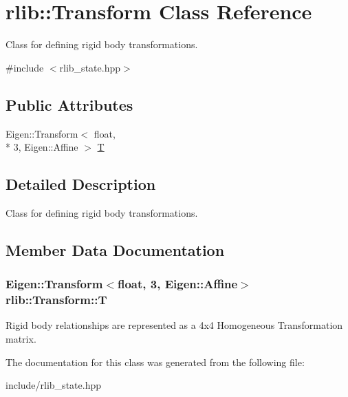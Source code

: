 \hypertarget{classrlib_1_1Transform}{\section{rlib\-:\-:Transform Class Reference}
\label{classrlib_1_1Transform}
}


Class for defining rigid body transformations.  




{\ttfamily \#include $<$rlib\-\_\-state.\-hpp$>$}

\subsection*{Public Attributes}
\begin{DoxyCompactItemize}
\item 
Eigen\-::\-Transform$<$ float, \\*
3, Eigen\-::\-Affine $>$ \hyperlink{classrlib_1_1Transform_a38135d56804225fa5e1bac5a5c6b3d9d}{T}
\end{DoxyCompactItemize}


\subsection{Detailed Description}
Class for defining rigid body transformations. 

\subsection{Member Data Documentation}
\hypertarget{classrlib_1_1Transform_a38135d56804225fa5e1bac5a5c6b3d9d}{
\subsubsection[{T}]{\setlength{\rightskip}{0pt plus 5cm}Eigen\-::\-Transform$<$float, 3, Eigen\-::\-Affine$>$ rlib\-::\-Transform\-::\-T}}\label{classrlib_1_1Transform_a38135d56804225fa5e1bac5a5c6b3d9d}
Rigid body relationships are represented as a 4x4 Homogeneous Transformation matrix. 

The documentation for this class was generated from the following file\-:\begin{DoxyCompactItemize}
\item 
include/rlib\-\_\-state.\-hpp\end{DoxyCompactItemize}
